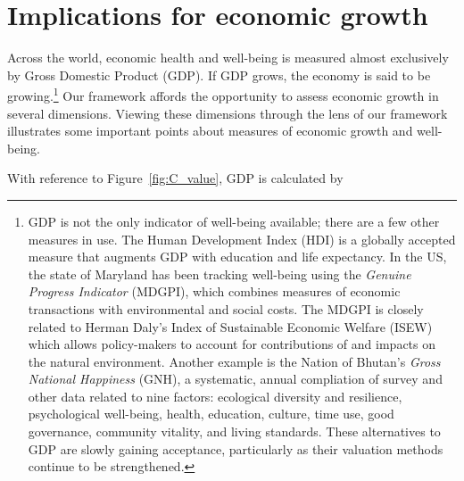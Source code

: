 \section{Implications for economic growth}
\label{sec:implications_for_development}

Across the world, economic health and well-being 
is measured almost exclusively 
by Gross Domestic Product (GDP). 
If GDP grows, the economy is said to be growing.\footnote{GDP 
	is not the only indicator of well-being available; 
	there are a few other measures in use.
	The Human Development Index (HDI) is a globally accepted measure 
	that augments GDP with education and life expectancy.\cite{Malik:2013aa} 
	In the US, the state of Maryland has been tracking well-being 
	using the \emph{Genuine Progress Indicator} (MDGPI),
	which combines measures of economic transactions with 
	environmental and social costs.\cite{MDDNR:2013aa,Bagstad:2007aa} 
	The MDGPI is closely related to 
	Herman Daly's Index of Sustainable Economic Welfare (ISEW)
	which allows policy-makers to account for contributions of and impacts on 
	the natural environment.\cite{Daly:1994aa,MDDNR:2014ab}
	Another example is the Nation of Bhutan's \emph{Gross National Happiness} (GNH),
	a systematic, annual compliation 
		of survey and other data related to nine factors: 
		ecological diversity and resilience,
		psychological well-being,
		health,
		education, 
		culture, 
		time use, 
		good governance, 
		community vitality, and 
		living standards.\cite{Ura:2012aa,GNH:2014aa}
	These alternatives to GDP are slowly gaining acceptance, particularly
	as their valuation methods continue to be strengthened.\cite{Lawn:2003aa}
 	}
Our framework affords the opportunity to assess economic growth 
in several dimensions.
Viewing these dimensions through the lens of our framework 
illustrates some important points about measures 
of economic growth and well-being.

% 
With reference to Figure~\ref{fig:C_value}, GDP is calculated by

